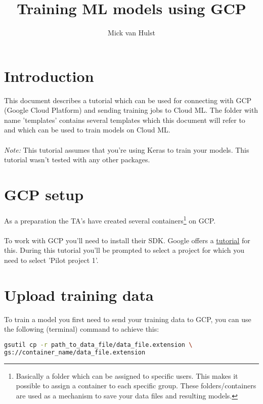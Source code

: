 \documentclass{article}
\title{Training ML models using GCP}
\author{Mick van Hulst}
\begin{document}
\maketitle

\section{Introduction}
This document describes a tutorial which can be used for connecting with GCP (Google Cloud Platform) and sending training jobs to Cloud ML. The folder with name 'templates' contains several templates which this document will refer to and which can be used to train models on Cloud ML. 
\\
\\
\textit{Note: }This tutorial assumes that you're using Keras to train your models. This tutorial wasn't tested with any other packages.

\section{GCP setup}
As a preparation the TA's have created several containers\footnote{Basically a folder which can be assigned to specific users. This makes it possible to assign a container to each specific group. These folders/containers are used as a mechanism to save your data files and resulting models.} on GCP.
\\
\\
To work with GCP you'll need to install their SDK. Google offers a \hyperlink{https://cloud.google.com/sdk/docs/}{tutorial} for this. During this tutorial you'll be prompted to select a project for which you need to select 'Pilot project 1'.

\section{Upload training data}
To train a model you first need to send your training data to GCP, you can use the following (terminal) command to achieve this:

\begin{lstlisting}[language=Bash]
gsutil cp -r path_to_data_file/data_file.extension \
gs://container_name/data_file.extension
\end{lstlisting}

\pagebreak
\end{document}
